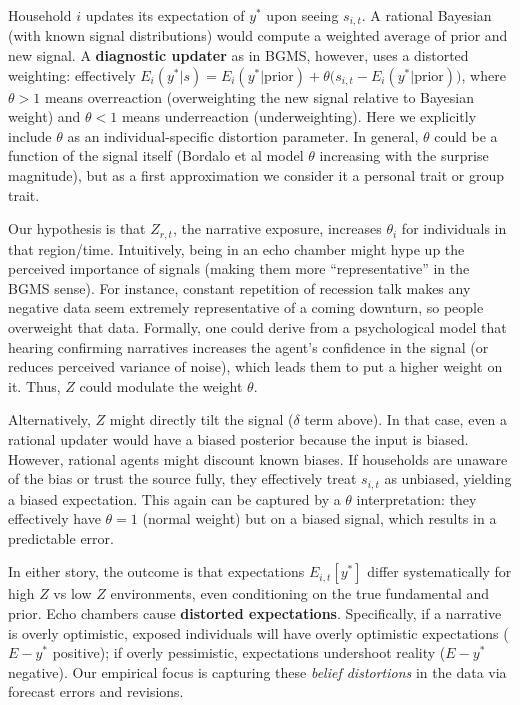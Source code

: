 \documentclass[12pt]{article}
\begin{document}
Household $i$ updates its expectation of $y^*$ upon seeing $s_{i,t}$. A rational Bayesian (with known signal distributions) would compute a weighted average of prior and new signal. A \textbf{diagnostic updater} as in BGMS, however, uses a distorted weighting: effectively $E_{i}(y^*|s) = E_{i}(y^*|\text{prior}) + \theta \big( s_{i,t} - E_{i}(y^*|\text{prior}) \big)$, where $\theta > 1$ means overreaction (overweighting the new signal relative to Bayesian weight) and $\theta < 1$ means underreaction (underweighting). Here we explicitly include $\theta$ as an individual-specific distortion parameter.
In general, $\theta$ could be a function of the signal itself (Bordalo et al model $\theta$ increasing with the surprise magnitude), but as a first approximation we consider it a personal trait or group trait.

Our hypothesis is that $Z_{r,t}$, the narrative exposure, increases $\theta_{i}$ for individuals in that region/time. Intuitively, being in an echo chamber might hype up the perceived importance of signals (making them more ``representative'' in the BGMS sense). For instance, constant repetition of recession talk makes any negative data seem extremely representative of a coming downturn, so people overweight that data. Formally, one could derive from a psychological model that hearing confirming narratives increases the agent's confidence in the signal (or reduces perceived variance of noise), which leads them to put a higher weight on it. Thus, $Z$ could modulate the weight $\theta$.

Alternatively, $Z$ might directly tilt the signal ($\delta$ term above). In that case, even a rational updater would have a biased posterior because the input is biased. However, rational agents might discount known biases. If households are unaware of the bias or trust the source fully, they effectively treat $s_{i,t}$ as unbiased, yielding a biased expectation. This again can be captured by a $\theta$ interpretation: they effectively have $\theta=1$ (normal weight) but on a biased signal, which results in a predictable error.

In either story, the outcome is that expectations $E_{i,t}[y^*]$ differ systematically for high $Z$ vs low $Z$ environments, even conditioning on the true fundamental and prior. Echo chambers cause \textbf{distorted expectations}. Specifically, if a narrative is overly optimistic, exposed individuals will have overly optimistic expectations ($E - y^*$ positive); if overly pessimistic, expectations undershoot reality ($E - y^*$ negative). Our empirical focus is capturing these \textit{belief distortions} in the data via forecast errors and revisions.
\end{document}
